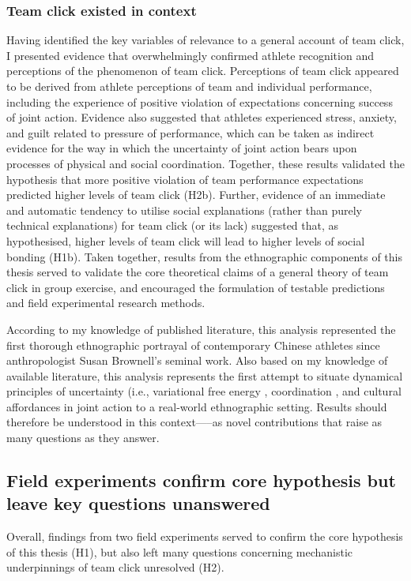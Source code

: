 \subsubsection{Team click existed in context}
Having identified the key variables of relevance to a general account of team click, I presented evidence that overwhelmingly confirmed athlete recognition and perceptions of the phenomenon of team click.  Perceptions of team click appeared to be derived from athlete perceptions of team and individual performance, including the experience of positive violation of expectations concerning success of joint action.  Evidence also suggested that athletes experienced stress, anxiety, and guilt related to pressure of performance, which can be taken as indirect evidence for the way in which the uncertainty of joint action bears upon processes of physical and social coordination.  Together, these results validated the hypothesis that more positive violation of team performance expectations predicted higher levels of team click (H2b).  Further, evidence of an immediate and automatic tendency to utilise social explanations (rather than purely technical explanations) for team click (or its lack) suggested that, as hypothesised, higher levels of team click will lead to higher levels of social bonding (H1b). Taken together, results from the ethnographic components of this thesis served to validate the core theoretical claims of a general theory of team click in group exercise, and encouraged the formulation of testable predictions and field experimental research methods.

According to my knowledge of published literature, this analysis represented the first thorough ethnographic portrayal of contemporary Chinese athletes since anthropologist Susan Brownell's seminal work.  Also based on my knowledge of available literature, this analysis represents the first attempt to situate dynamical principles of uncertainty (i.e., variational free energy \citep{Friston2010}, coordination \citep{Kelso2009}, and cultural affordances \citep{Ramstead2016} in joint action to a real-world ethnographic setting.  Results should therefore be understood in this context—--as novel contributions that raise as many questions as they answer.

\subsection{Field experiments confirm core hypothesis but leave key questions unanswered}
Overall, findings from two field experiments served to confirm the core hypothesis of this thesis (H1),  but also left many questions concerning mechanistic underpinnings of team click unresolved (H2).

